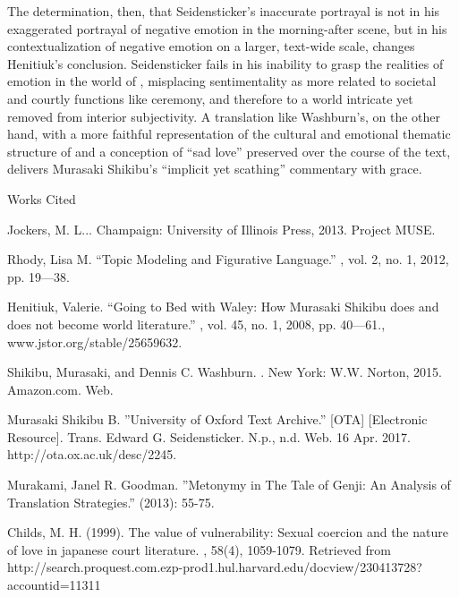 \documentclass[12pt]{article}
\newcommand{\bibent}{\noindent \hangindent 40pt}
\newenvironment{workscited}{\newpage \begin{center} Works Cited \end{center}}{\newpage }
\begin{document}
\begin{flushleft}
\begin{spacing}{2.0}
The determination, then, that Seidensticker's inaccurate portrayal is not in his exaggerated portrayal of negative emotion in the morning-after scene, but in his contextualization of negative emotion on a larger, text-wide scale, changes Henitiuk's conclusion. Seidensticker fails in his inability to grasp the realities of emotion in the world of , misplacing sentimentality as more related to societal and courtly functions like ceremony, and therefore to a world intricate yet removed from interior subjectivity. A translation like Washburn's, on the other hand, with a more faithful representation of the cultural and emotional thematic structure of  and a conception of ``sad love'' preserved over the course of the text, delivers Murasaki Shikibu's ``implicit yet scathing'' commentary with grace.

\begin{workscited}

\bibent Jockers, M. L... Champaign: University of Illinois Press, 2013. Project MUSE.

\bibent Rhody, Lisa M. ``Topic Modeling and Figurative Language.'' , vol. 2, no. 1, 2012, pp. 19---38.

\bibent Henitiuk, Valerie. ``Going to Bed with Waley: How Murasaki Shikibu does and does not become world literature.'' , vol. 45, no. 1, 2008, pp. 40---61., www.jstor.org/stable/25659632.

\bibent Shikibu, Murasaki, and Dennis C. Washburn. . New York: W.W. Norton, 2015. Amazon.com. Web.

\bibent Murasaki Shikibu B. ''University of Oxford Text Archive.'' [OTA]  [Electronic Resource]. Trans. Edward G. Seidensticker. N.p., n.d. Web. 16 Apr. 2017. http://ota.ox.ac.uk/desc/2245.

\bibent Murakami, Janel R. Goodman. ''Metonymy in The Tale of Genji: An Analysis of Translation Strategies.''  (2013): 55-75.

\bibent Childs, M. H. (1999). The value of vulnerability: Sexual coercion and the nature of love in japanese court literature. , 58(4), 1059-1079. Retrieved from http://search.proquest.com.ezp-prod1.hul.harvard.edu/docview/230413728?accountid=11311
\end{workscited}


\end{spacing}
\end{flushleft}
\end{document}
